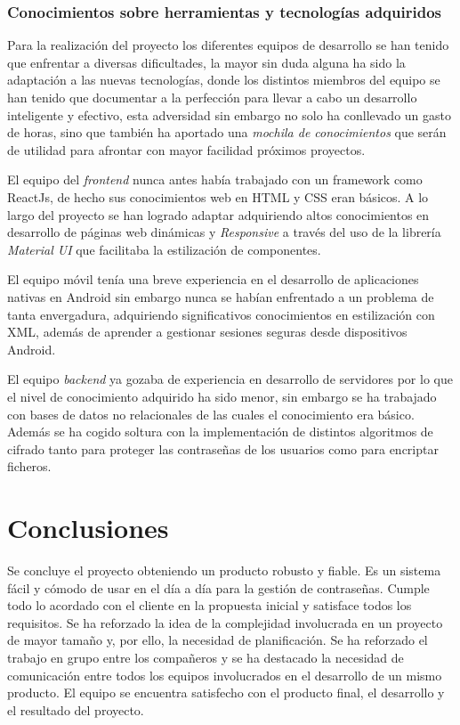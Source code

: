 \documentclass{article}
\begin{document}
\subsubsection*{Conocimientos sobre herramientas y tecnologías adquiridos}

Para la realización del proyecto los diferentes equipos de desarrollo se han tenido que enfrentar a diversas dificultades, la mayor sin duda alguna ha sido la adaptación a las nuevas tecnologías, donde los distintos miembros del equipo se han tenido que documentar a la perfección para llevar a cabo un desarrollo inteligente y efectivo, esta adversidad sin embargo no solo ha conllevado un gasto de horas, sino que también ha aportado una \textit{mochila de conocimientos} que serán de utilidad para afrontar con mayor facilidad próximos proyectos.

El equipo del \textit{frontend} nunca antes había trabajado con un framework como ReactJs, de hecho sus conocimientos web en HTML y CSS eran básicos. A lo largo del proyecto se han logrado adaptar adquiriendo altos conocimientos en desarrollo de páginas web dinámicas y \textit{Responsive} a través del uso de la librería \textit{Material UI} que facilitaba la estilización de componentes.

El equipo móvil tenía una breve experiencia en el desarrollo de aplicaciones nativas en Android sin embargo nunca se habían enfrentado a un problema de tanta envergadura, adquiriendo significativos conocimientos en estilización con XML, además de aprender a gestionar sesiones seguras desde dispositivos Android.

El equipo \textit{backend} ya gozaba de experiencia en desarrollo de servidores por lo que el nivel de conocimiento adquirido ha sido menor, sin embargo se ha trabajado con bases de datos no relacionales de las cuales el conocimiento era básico. Además se ha cogido soltura con la implementación de distintos algoritmos de cifrado tanto para proteger las contraseñas de los usuarios como para encriptar ficheros.

\pagebreak

\section*{Conclusiones}

Se concluye el proyecto obteniendo un producto robusto y fiable. Es un sistema fácil y cómodo de usar en el día a día para la gestión de contraseñas. Cumple todo lo acordado con el cliente en la propuesta inicial y satisface todos los requisitos. Se ha reforzado la idea de la complejidad involucrada en un proyecto de mayor tamaño y, por ello, la necesidad de planificación. Se ha reforzado el trabajo en grupo entre los compañeros y se ha destacado la necesidad de comunicación entre todos los equipos involucrados en el desarrollo de un mismo producto. El equipo se encuentra satisfecho con el producto final, el desarrollo y el resultado del proyecto.
\end{document}
